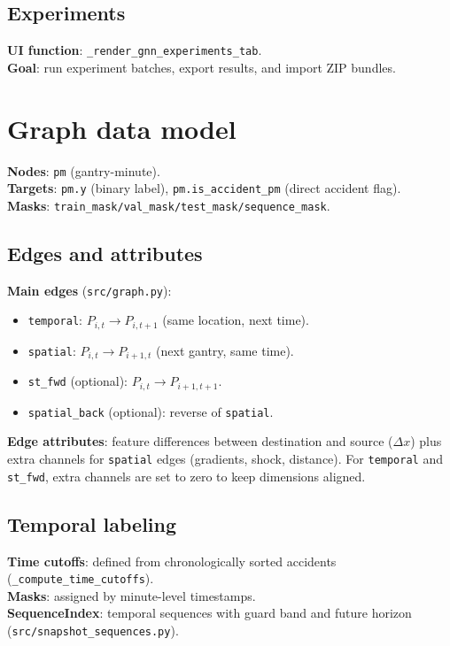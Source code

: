 \subsection{Experiments}
\textbf{UI function}: \texttt{\_render\_gnn\_experiments\_tab}.\\
\textbf{Goal}: run experiment batches, export results, and import ZIP bundles.

\section{Graph data model}
\label{sec:grafo}
\textbf{Nodes}: \texttt{pm} (gantry-minute).\\
\textbf{Targets}: \texttt{pm.y} (binary label), \texttt{pm.is\_accident\_pm} (direct accident flag).\\
\textbf{Masks}: \texttt{train\_mask/val\_mask/test\_mask/sequence\_mask}.

\subsection{Edges and attributes}
\textbf{Main edges} (\texttt{src/graph.py}):
\begin{itemize}[leftmargin=*]
  \item \texttt{temporal}: $P_{i,t} \to P_{i,t+1}$ (same location, next time).
  \item \texttt{spatial}: $P_{i,t} \to P_{i+1,t}$ (next gantry, same time).
  \item \texttt{st\_fwd} (optional): $P_{i,t} \to P_{i+1,t+1}$.
  \item \texttt{spatial\_back} (optional): reverse of \texttt{spatial}.
\end{itemize}
\textbf{Edge attributes}: feature differences between destination and source ($\Delta x$) plus extra channels for \texttt{spatial} edges (gradients, shock, distance). For \texttt{temporal} and \texttt{st\_fwd}, extra channels are set to zero to keep dimensions aligned.

\subsection{Temporal labeling}
\textbf{Time cutoffs}: defined from chronologically sorted accidents (\texttt{\_compute\_time\_cutoffs}).\\
\textbf{Masks}: assigned by minute-level timestamps.\\
\textbf{SequenceIndex}: temporal sequences with guard band and future horizon (\texttt{src/snapshot\_sequences.py}).

